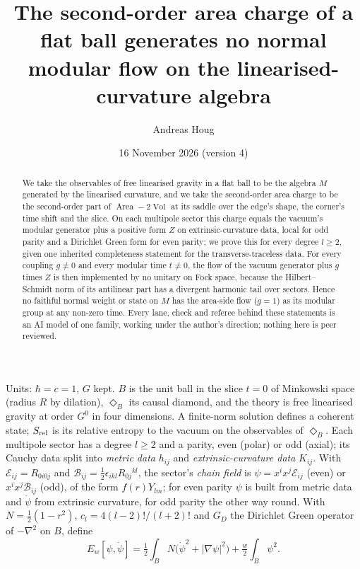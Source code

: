 \documentclass[11pt]{article}
\title{The second-order area charge of a flat ball generates no normal\\ modular flow on the linearised-curvature algebra}
\author{Andreas Houg}
\date{16 November 2026 (version 4)}
\makeatletter
\newcommand{\cE}{\mathcal{E}}
\newcommand{\cB}{\mathcal{B}}
\newcommand{\Area}{\operatorname{Area}}
\newcommand{\Vol}{\operatorname{Vol}}
\newcommand{\Srel}{S_{\rm rel}}
\newcommand{\GD}{G_{\!D}}
\newcommand{\diam}{\Diamond_B}
\renewcommand\section{\@startsection{section}{1}{\z@}{-2.4ex \@plus -1ex \@minus -.2ex}{1.2ex \@plus .2ex}{\normalfont\Large\bfseries}}
\makeatother
\begin{document}
\maketitle

\begin{abstract}
We take the observables of free linearised gravity in a flat ball to be the algebra $M$ generated by the linearised curvature, and we take the second-order area charge to be the second-order part of $\Area-2\Vol$ at its saddle over the edge's shape, the corner's time shift and the slice. On each multipole sector this charge equals the vacuum's modular generator plus a positive form $Z$ on extrinsic-curvature data, local for odd parity and a Dirichlet Green form for even parity; we prove this for every degree $l\ge2$, given one inherited completeness statement for the transverse-traceless data. For every coupling $g\neq0$ and every modular time $t\neq0$, the flow of the vacuum generator plus $g$ times $Z$ is then implemented by no unitary on Fock space, because the Hilbert--Schmidt norm of its antilinear part has a divergent harmonic tail over sectors. Hence no faithful normal weight or state on $M$ has the area-side flow ($g=1$) as its modular group at any non-zero time. Every lane, check and referee behind these statements is an AI model of one family, working under the author's direction; nothing here is peer reviewed.
\end{abstract}

\section{Result, assumptions and evidence}\label{sec:result}

Units: $\hbar=c=1$, $G$ kept. $B$ is the unit ball in the slice $t=0$ of Minkowski space (radius $R$ by dilation), $\diam$ its causal diamond, and the theory is free linearised gravity at order $G^0$ in four dimensions. A finite-norm solution defines a coherent state; $\Srel$ is its relative entropy to the vacuum on the observables of $\diam$. Each multipole sector has a degree $l\ge2$ and a parity, even (polar) or odd (axial); its Cauchy data split into \emph{metric data} $h_{ij}$ and \emph{extrinsic-curvature data} $K_{ij}$. With $\cE_{ij}=R_{0i0j}$ and $\cB_{ij}=\tfrac12\epsilon_{ikl}R_{0j}{}^{kl}$, the sector's \emph{chain field} is $\psi=x^ix^j\cE_{ij}$ (even) or $x^ix^j\cB_{ij}$ (odd), of the form $f(r)Y_{lm}$; for even parity $\psi$ is built from metric data and $\dot\psi$ from extrinsic curvature, for odd parity the other way round. With $N=\frac12(1-r^2)$, $c_l=4(l-2)!/(l+2)!$ and $\GD$ the Dirichlet Green operator of $-\nabla^2$ on $B$, define
\[
E_w[\psi,\dot\psi]=\tfrac12\int_BN\bigl(\dot\psi^2+|\nabla\psi|^2\bigr)+\tfrac w2\int_B\psi^2 .
\]
\end{document}

